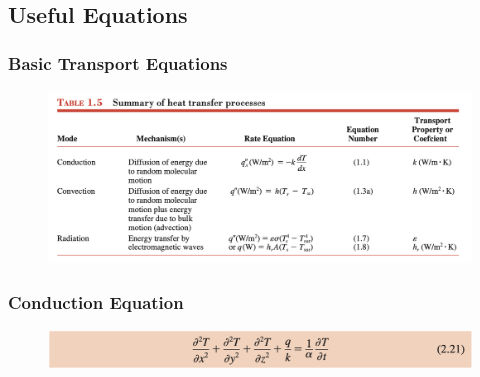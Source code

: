 \documentclass[12pt,letterpaper]{article}
\begin{document}
\begin{enumerate}
\end{enumerate}

~
\newpage
~
\newpage
~
\newpage
~
\newpage
~
\newpage
~
\newpage

\subsection*{Useful Equations}

\subsubsection*{Basic Transport Equations}

\begin{figure}[!htpb]
    \centering
    \includegraphics[width=0.95\linewidth]{./image10.png}
\end{figure}


\clearpage
\subsubsection*{Conduction Equation}

\begin{figure}[!htpb]
    \centering
    \includegraphics[width=0.95\linewidth]{./image20.png}
\end{figure}
\end{document}
